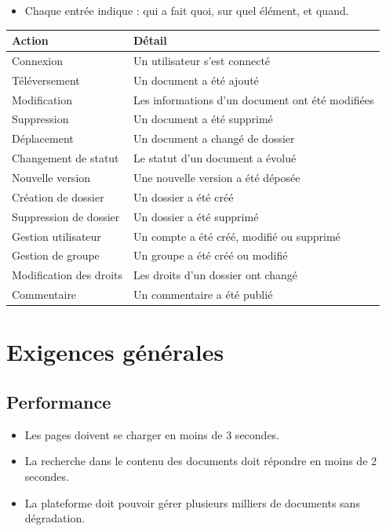 \documentclass[a4paper,12pt,french]{article}
\begin{document}
\begin{itemize}[leftmargin=1.5em]
  \item Chaque entrée indique : qui a fait quoi, sur quel élément, et quand.
\end{itemize}

\begin{tabularx}{\textwidth}{l X}
\toprule
\textbf{Action} & \textbf{Détail} \\
\midrule
Connexion & Un utilisateur s'est connecté \\
Téléversement & Un document a été ajouté \\
Modification & Les informations d'un document ont été modifiées \\
Suppression & Un document a été supprimé \\
Déplacement & Un document a changé de dossier \\
Changement de statut & Le statut d'un document a évolué \\
Nouvelle version & Une nouvelle version a été déposée \\
Création de dossier & Un dossier a été créé \\
Suppression de dossier & Un dossier a été supprimé \\
Gestion utilisateur & Un compte a été créé, modifié ou supprimé \\
Gestion de groupe & Un groupe a été créé ou modifié \\
Modification des droits & Les droits d'un dossier ont changé \\
Commentaire & Un commentaire a été publié \\
\bottomrule
\end{tabularx}


\section{Exigences générales}

\subsection{Performance}

\begin{itemize}[leftmargin=1.5em]
  \item Les pages doivent se charger en moins de 3 secondes.
  \item La recherche dans le contenu des documents doit répondre en moins de 2 secondes.
  \item La plateforme doit pouvoir gérer plusieurs milliers de documents sans dégradation.
\end{itemize}
\end{document}
